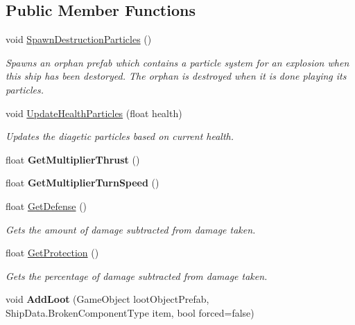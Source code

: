 \subsection*{Public Member Functions}
\begin{DoxyCompactItemize}
\item 
void \hyperlink{class_skyrates_1_1_ship_1_1_ship_hull_a151ef86db5f7fb51fafc874fd2174c6c}{Spawn\-Destruction\-Particles} ()
\begin{DoxyCompactList}\small\item\em Spawns an orphan prefab which contains a particle system for an explosion when this ship has been destoryed. The orphan is destroyed when it is done playing its particles. \end{DoxyCompactList}\item 
void \hyperlink{class_skyrates_1_1_ship_1_1_ship_hull_addcf983df8b3aa8556d77730be45ecc8}{Update\-Health\-Particles} (float health)
\begin{DoxyCompactList}\small\item\em Updates the diagetic particles based on current health. \end{DoxyCompactList}\item 
\hypertarget{class_skyrates_1_1_ship_1_1_ship_hull_a31ea2269f79ffc533d3c0ce80ac59a24}{float {\bfseries Get\-Multiplier\-Thrust} ()}\label{class_skyrates_1_1_ship_1_1_ship_hull_a31ea2269f79ffc533d3c0ce80ac59a24}

\item 
\hypertarget{class_skyrates_1_1_ship_1_1_ship_hull_a97cbc4f31c6664328ce5ac804e4b5510}{float {\bfseries Get\-Multiplier\-Turn\-Speed} ()}\label{class_skyrates_1_1_ship_1_1_ship_hull_a97cbc4f31c6664328ce5ac804e4b5510}

\item 
float \hyperlink{class_skyrates_1_1_ship_1_1_ship_hull_a22cc110b5c5d2ee55b9da0c34da68468}{Get\-Defense} ()
\begin{DoxyCompactList}\small\item\em Gets the amount of damage subtracted from damage taken. \end{DoxyCompactList}\item 
float \hyperlink{class_skyrates_1_1_ship_1_1_ship_hull_adb5a6383a4f88675441a24f4c7c33f8b}{Get\-Protection} ()
\begin{DoxyCompactList}\small\item\em Gets the percentage of damage subtracted from damage taken. \end{DoxyCompactList}\item 
\hypertarget{class_skyrates_1_1_ship_1_1_ship_hull_a1ec01ed2a0eff0018dc11db98de9dbd6}{void {\bfseries Add\-Loot} (Game\-Object loot\-Object\-Prefab, Ship\-Data.\-Broken\-Component\-Type item, bool forced=false)}\label{class_skyrates_1_1_ship_1_1_ship_hull_a1ec01ed2a0eff0018dc11db98de9dbd6}


\end{DoxyCompactItemize}

